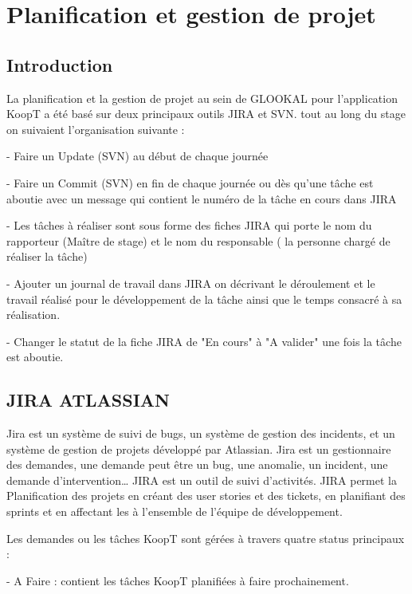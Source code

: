 \chapter{Planification et gestion de projet}
\label{sec:Planification et gestion de projet}

\section*{Introduction}

La planification et la gestion de projet au sein de GLOOKAL pour l’application KoopT a été basé sur deux  principaux outils JIRA et SVN.
tout au long du stage on suivaient l’organisation suivante :

- Faire un Update (SVN) au début de chaque journée 

- Faire un Commit (SVN) en fin de chaque journée ou dès qu’une tâche est aboutie avec un message qui contient le numéro de la tâche en cours dans JIRA

- Les tâches à réaliser sont sous forme des fiches JIRA qui porte le nom du rapporteur (Maître de stage) et le nom du responsable ( la personne chargé de réaliser la tâche)

- Ajouter un journal de travail dans JIRA on décrivant le déroulement et le travail réalisé  pour le développement de la tâche ainsi que le temps consacré à sa réalisation.

- Changer le statut de la fiche JIRA de "En cours" à "A valider" une fois la tâche est aboutie.



\section{JIRA ATLASSIAN}

Jira est un système de suivi de bugs, un système de gestion des incidents, et un système de gestion de projets développé par Atlassian.
Jira est un gestionnaire des demandes, une demande peut être un bug, une anomalie, un incident, une demande d’intervention…  JIRA est un outil de suivi d’activités.
JIRA permet la Planification des projets en créant des user stories et des tickets, en planifiant des sprints et en affectant les à l’ensemble de l’équipe de développement.
 
 
Les demandes ou les tâches KoopT sont gérées à travers quatre status principaux : 

- A Faire : contient les tâches KoopT planifiées à faire prochainement.


